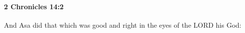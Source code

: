 
		\paragraph{2 Chronicles 14:2} %
			\label{2CHRONICLES-14-2}

			And Asa did that which was good and right in the eyes of the LORD his God:


